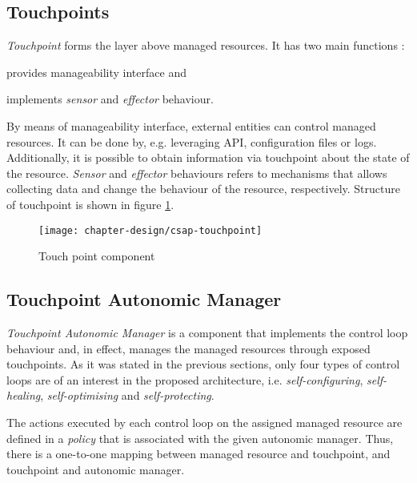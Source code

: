 \subsection{Touchpoints}
\emph{Touchpoint} forms the layer above managed resources. It has two main functions \cite{IBM06}:
\begin{inparaenum}[1)]
\item provides manageability interface and
\item implements \emph{sensor} and \emph{effector} behaviour.
\end{inparaenum}

By means of manageability interface, external entities can control managed resources. It can be done by, e.g. leveraging API, configuration files or logs. Additionally, it is possible to obtain information via touchpoint about the state of the resource. \emph{Sensor} and \emph{effector} behaviours refers to mechanisms that allows collecting data and change the behaviour of the resource, respectively. Structure of touchpoint is shown in figure \ref{img:csap-touchpoint}.

\begin{figure}[!ht]
  \begin{center}
    \texttt{[image: chapter-design/csap-touchpoint]}
  \end{center}
  \caption{Touch point component}
  \label{img:csap-touchpoint}
\end{figure}

\subsection{Touchpoint Autonomic Manager}
\emph{Touchpoint Autonomic Manager} is a component that implements the control loop behaviour and, in effect, manages the managed resources through exposed touchpoints. As it was stated in the previous sections, only four types of control loops are of an interest in the proposed architecture, i.e. \emph{self-configuring}, \emph{self-healing}, \emph{self-optimising} and \emph{self-protecting}.

The actions executed by each control loop on the assigned managed resource are defined in a \emph{policy} that is associated with the given autonomic manager. Thus, there is a one-to-one mapping between managed resource and touchpoint, and touchpoint and autonomic manager.

